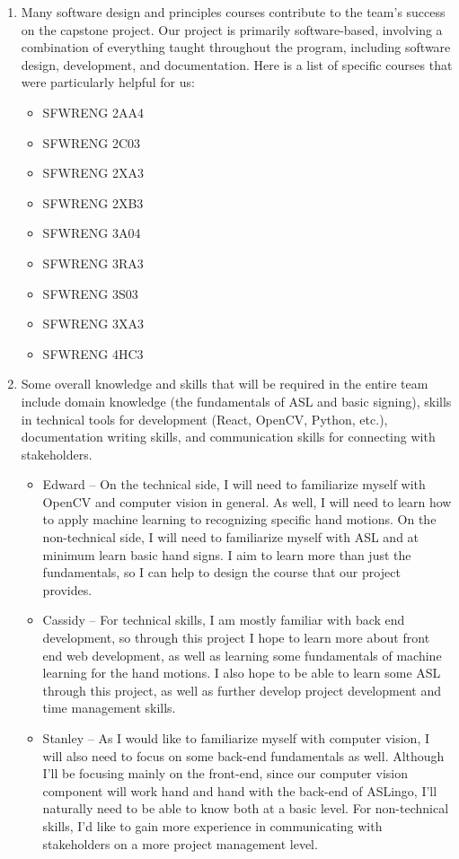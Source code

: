 \documentclass[12pt, titlepage]{article}
\begin{document}
\begin{enumerate}
    \item Many software design and principles courses contribute to the team's success on the capstone project. Our project is primarily software-based, involving a combination of everything taught throughout the program, including software design, development, and documentation. Here is a list of specific courses that were particularly helpful for us: 
    \begin{itemize}
        \item SFWRENG 2AA4
        \item SFWRENG 2C03
        \item SFWRENG 2XA3
        \item SFWRENG 2XB3
        \item SFWRENG 3A04
        \item SFWRENG 3RA3
        \item SFWRENG 3S03
        \item SFWRENG 3XA3
        \item SFWRENG 4HC3
    \end{itemize}
    \item Some overall knowledge and skills that will be required in the entire team include domain knowledge (the fundamentals of ASL and basic signing), skills in technical tools for development (React, OpenCV, Python, etc.), documentation writing skills, and communication skills for connecting with stakeholders.
    \begin{itemize}
        \item Edward -- On the technical side, I will need to familiarize myself with OpenCV and computer vision in general. As well, I will need to learn how to apply machine learning to recognizing specific hand motions. On the non-technical side, I will need to familiarize myself with ASL and at minimum learn basic hand signs. I aim to learn more than just the fundamentals, so I can help to design the course that our project provides.
	    \item Cassidy -- For technical skills, I am mostly familiar with back end development, so through this project I hope to learn more about front end web development, as well as learning some fundamentals of machine learning for the hand motions. I also hope to be able to learn some ASL through this project, as well as further develop project development and time management skills.
        \item Stanley -- As I would like to familiarize myself with computer vision, I will also need to focus on some back-end fundamentals as well. Although I'll be focusing mainly on the front-end, since our computer vision component will work hand and hand with the back-end of ASLingo, I'll naturally need to be able to know both at a basic level. For non-technical skills, I'd like to gain more experience in communicating with stakeholders on a more project management level.

\end{itemize}
\end{enumerate}
\end{document}
